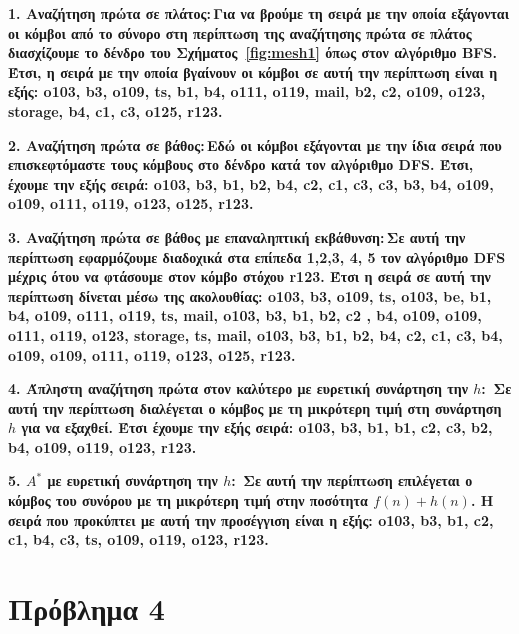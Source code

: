 \documentclass[12pt]{article}
\newcommand {\lat}{\latintext}
\theoremstyle{definition}
\begin{document}
\noindent \bf 1. Αναζήτηση πρώτα σε πλάτος:\,\normalfont Για να βρούμε τη σειρά με την οποία εξάγονται οι κόμβοι από το σύνορο στη περίπτωση της αναζήτησης πρώτα σε πλάτος διασχίζουμε το δένδρο του Σχήματος~\ref{fig:mesh1} όπως στον αλγόριθμο {\lat BFS}. Έτσι, η σειρά με την οποία βγαίνουν οι κόμβοι σε αυτή την περίπτωση είναι η εξής: {\lat o103, b3, o109, ts, b1, b4, o111, o119, mail, b2, c2, o109, o123, storage, b4, c1, c3, o125, r123}.
\vspace{2mm}

\noindent \bf 2. Αναζήτηση πρώτα σε βάθος:\,\normalfont Εδώ οι κόμβοι εξάγονται με την ίδια σειρά που επισκεφτόμαστε τους κόμβους στο δένδρο κατά τον αλγόριθμο {\lat DFS}. Έτσι, έχουμε την εξής σειρά: {\lat o103, b3, b1, b2, b4, c2, c1, c3, c3, b3, b4, o109, o109, o111, o119, o123, o125, r123}.
\vspace{2mm}

\noindent \bf 3. Αναζήτηση πρώτα σε βάθος με επαναληπτική εκβάθυνση:\,\normalfont  Σε αυτή την περίπτωση εφαρμόζουμε διαδοχικά στα επίπεδα 1,2,3, 4, 5 τον αλγόριθμο {\lat DFS} μέχρις ότου να φτάσουμε στον κόμβο στόχου {\lat r123}. Έτσι η σειρά σε αυτή την περίπτωση δίνεται μέσω της ακολουθίας: {\lat o103, b3, o109, ts, o103, be, b1, b4, o109, o111, o119, ts, mail, o103, b3, b1, b2, c2 , b4, o109, o109, o111, o119, o123, storage, ts, mail, o103, b3, b1, b2, b4, c2, c1, c3, b4, o109, o109, o111, o119, o123, o125, r123}.
\vspace{2mm}

\noindent \bf 4. Άπληστη αναζήτηση πρώτα στον καλύτερο με ευρετική συνάρτηση την $h$:\normalfont\, Σε αυτή την περίπτωση διαλέγεται ο κόμβος με τη μικρότερη τιμή στη συνάρτηση $h$ για να εξαχθεί. Έτσι έχουμε την εξής σειρά: {\lat o103, b3, b1, b1, c2, c3, b2, b4, o109, o119, o123, r123}.
\vspace{2mm}

\noindent \bf 5. $A^*$ με ευρετική συνάρτηση την $h$:\, \normalfont Σε αυτή την περίπτωση επιλέγεται ο κόμβος του συνόρου με τη μικρότερη τιμή στην ποσότητα $f(n)+h(n)$. Η σειρά που προκύπτει με αυτή την προσέγγιση είναι η εξής: {\lat o103, b3, b1, c2, c1, b4, c3, ts, o109, o119, o123, r123.}
\vspace{2mm}

\section*{Πρόβλημα 4}
\end{document}
